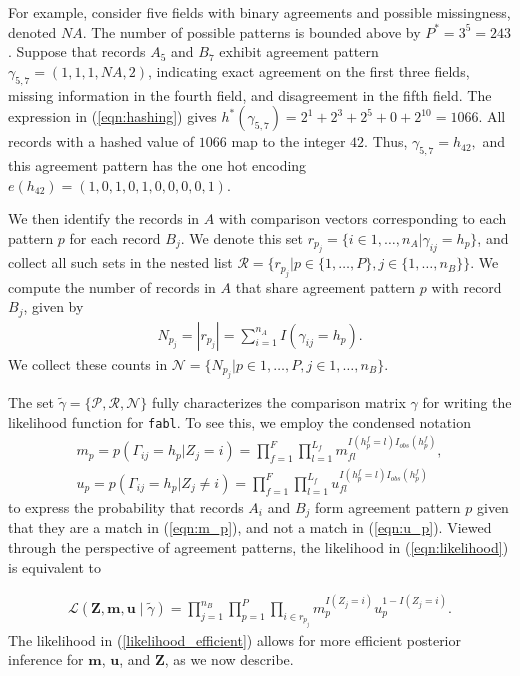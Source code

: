 \documentclass[ba]{imsart}
\begin{document}
For example, consider five fields with binary agreements and possible missingness, denoted $NA$. The number of possible patterns is bounded above by $P^{*} = 3^5 = 243$. Suppose that records $A_5$ and $B_7$ exhibit agreement pattern $\gamma_{5,7} = (1, 1, 1, NA, 2)$, indicating exact agreement on the first three fields, missing information in the fourth field, and disagreement in the fifth field. The expression in  (\ref{eqn:hashing}) gives $h^{*}(\gamma_{5,7}) = 2^1 + 2^3 + 2^5 + 0 + 2^{10} = 1066$. All records with a hashed value of $1066$ map to the integer $42$. Thus, $\gamma_{5,7} = h_{42},$ and this agreement pattern has the one hot encoding $e(h_{42}) = (1, 0, 1, 0, 1, 0, 0, 0, 0, 1)$.

We then identify the records in $A$ with comparison vectors corresponding to each pattern $p$ for each record $B_j$. We denote this set $r_{p_j} = \{i \in 1, \dots, n_A | \gamma_{ij} = h_p\}$, and collect all such sets in the nested list $\mathcal{R} = \{r_{p_j} | p \in \{1, \ldots, P\}, j \in \{1, \ldots, n_B\} \}$. We compute the number of records in $A$ that share agreement pattern $p$ with record $B_j$, given by
\begin{align}\label{eqn:N}
N_{p_j} = |r_{p_j}| = \sum_{i=1}^{n_A} I(\gamma_{ij} = h_p).
\end{align}
We collect these counts in $\mathcal{N} = \{N_{p_j} |p \in 1, \ldots, P, j \in 1, \ldots, n_B \}$. 

The set $\tilde{\gamma} = \{\mathcal{P}, \mathcal{R}, \mathcal{N}\}$ fully characterizes the comparison matrix $\gamma$ for writing the likelihood function for \texttt{fabl}. To see this, we employ the condensed notation
\begin{subequations}
	\begin{align}
		m_p =  p(\Gamma_{ij} = h_p|Z_j = i) = \prod_{f=1}^{F}\prod_{l=1}^{L_f} m_{fl}^{I(h_p^f = l)I_{obs}(h_p^f)}, \label{eqn:m_p} \\
		u_p =  p(\Gamma_{ij} = h_p|Z_j \neq i) = \prod_{f=1}^{F}\prod_{l=1}^{L_f} u_{fl}^{I(h_p^f = l)I_{obs}(h_p^f)}\label{eqn:u_p}
	\end{align}
\end{subequations}
to express the probability that records $A_i$ and $B_j$ form agreement pattern $p$ given that they are a match in (\ref{eqn:m_p}), and not a match in (\ref{eqn:u_p}). Viewed through the perspective of agreement patterns, the likelihood in (\ref{eqn:likelihood}) is equivalent to

\begin{align}\label{likelihood_efficient}
	\mathcal{L}(\bm{Z}, \bm{m}, \bm{u} \mid \tilde{\gamma}) = \prod_{j=1}^{n_B}\prod_{p=1}^P \prod_{i \in r_{p_j}} m_p^{I(Z_j = i)}u_p^{1 - I(Z_j = i)}. 
\end{align}
The likelihood in (\ref{likelihood_efficient}) allows for more
efficient posterior inference for $\bm{m}$, $\bm{u}$, and $\bm{Z}$, as we now describe.
\end{document}

